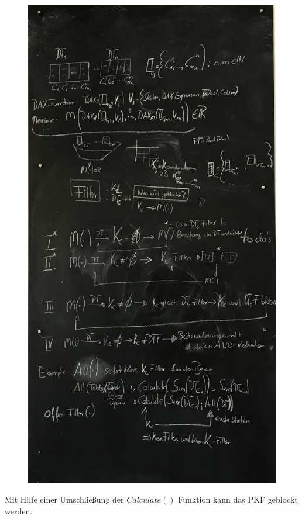 \begin{itemize}
\begin{itemize}
\begin{itemize}
\begin{figure}[H]
				\includegraphics[scale = 0.1]{attachment/chapter_1/screenshot116}
				\caption{}
				\label{fig:screenshot116}
			\end{figure} 
		\end{itemize}
		Mit Hilfe einer Umschließung der $Calculate()$ Funktion kann das \gls{PKF} geblockt werden.
		\begin{lstlisting}[style=DAX]

\end{lstlisting}
\end{itemize}
\end{itemize}
